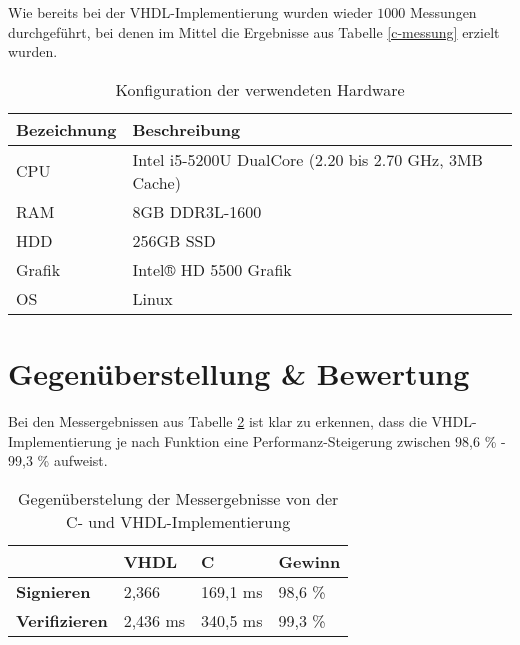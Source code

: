 Wie bereits bei der VHDL-Implementierung wurden wieder $1000$ Messungen durchgeführt, bei denen im Mittel die Ergebnisse aus Tabelle \ref{c-messung} erzielt wurden. \\

\begin{table}
	\centering 
	\begin{tabular}{ | l | l | }
		\hline
		Bezeichnung & Beschreibung \\
		\hline
		CPU & Intel i5-5200U DualCore (2.20 bis 2.70 GHz, 3MB Cache) \\ 
		RAM & 8GB DDR3L-1600 \\
		HDD & 256GB SSD  \\
		Grafik & Intel® HD 5500 Grafik \\
		OS & Linux \\
		\hline
	\end{tabular}
	\caption{Konfiguration der verwendeten Hardware}
	\label{c-impl-hardware}
\end{table}


\section{Gegenüberstellung \& Bewertung}
\label{sec:messung-results}

Bei den Messergebnissen aus Tabelle \ref{messung-results} ist klar zu erkennen, dass die VHDL-Implementierung je nach Funktion eine Performanz-Steigerung zwischen 98,6 \% - 99,3 \% aufweist. \\

\begin{table} [h]
	\centering 
	\begin{tabular}{ | p{3cm} | p{2cm} | p{2cm} | p{2cm} | }
		\hline
		 & \textbf{VHDL} & \textbf{C} & \textbf{Gewinn} \\
		\hline
		\textbf{Signieren} & 2,366 & 169,1 ms & 98,6 \% \\
		\hline
		\textbf{Verifizieren} &  2,436 ms & 340,5 ms & 99,3 \% \\
		\hline
	\end{tabular}
	\caption{Gegenüberstelung der Messergebnisse von der C- und VHDL-Implementierung}
	\label{messung-results}
\end{table}

